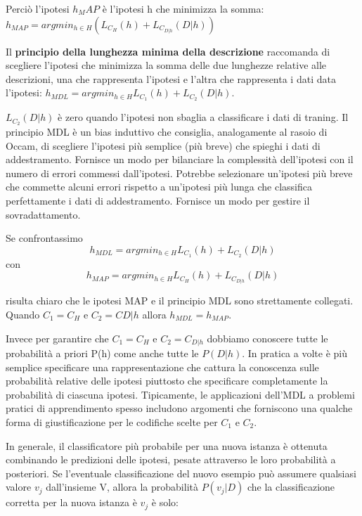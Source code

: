 \documentclass[a4paper]{extarticle}
\begin{document}
Perciò l'ipotesi $h_MAP$ è l'ipotesi h che minimizza la somma: $h_{MAP} = argmin_{h \in H} (L_{C_H}(h) + L_{C_{D|h}}(D|h))$

Il \textbf{principio della lunghezza minima della descrizione } raccomanda di scegliere l'ipotesi che minimizza la somma delle due lunghezze relative alle descrizioni, una che rappresenta l'ipotesi e l'altra che rappresenta i dati data l'ipotesi: $h_{MDL} = argmin_{h \in H} L_{C_1}(h) + L_{C_2} (D|h)$. 

$L_{C_2}(D|h)$ è zero quando l'ipotesi non sbaglia a classificare i dati di traning. Il principio MDL è un bias induttivo che consiglia, analogamente al rasoio di Occam, di scegliere l’ipotesi più semplice (più breve) che spieghi i dati di addestramento. Fornisce un modo per bilanciare la complessità dell'ipotesi con il numero di errori commessi dall'ipotesi. Potrebbe selezionare un'ipotesi più breve che commette alcuni errori rispetto a un'ipotesi più lunga che classifica perfettamente i dati di addestramento. Fornisce un modo per gestire il sovradattamento.

Se confrontassimo 
\begin{equation*}
h_{MDL} = argmin_{h\in H} L_{C_1} (h) + L_{C_2}(D|h)
\end{equation*}
con
\begin{equation*}
h_{MAP} = argmin_{h\in H} L_{C_H} (h) + L_{C_{D|h}}(D|h)
\end{equation*}

risulta chiaro che le ipotesi MAP e il principio MDL sono strettamente collegati. Quando $C_1 = C_H$ e $C_2=C{D|h}$ allora $h_{MDL} = h_{MAP}$.

Invece per garantire che $C_1=C_H$ e $C_2=C_{D|h}$ dobbiamo conoscere tutte le probabilità a priori P(h) come anche tutte le $P(D|h)$. In pratica a volte è più semplice specificare una rappresentazione che cattura la conoscenza sulle probabilità relative delle ipotesi piuttosto che specificare completamente la probabilità di ciascuna ipotesi. Tipicamente, le applicazioni dell’MDL a problemi pratici di apprendimento spesso includono argomenti che forniscono una qualche forma di giustificazione per le codifiche scelte per $C_1$ e $C_2$.

In generale, il classificatore più probabile per una nuova istanza è ottenuta combinando le predizioni delle ipotesi, pesate attraverso le loro probabilità a posteriori. Se l'eventuale classificazione del nuovo esempio può assumere qualsiasi valore $v_j$ dall'insieme V, allora la probabilità $P(v_j|D)$  che la classificazione corretta per la nuova istanza è $v_j$ è solo:
\end{document}
